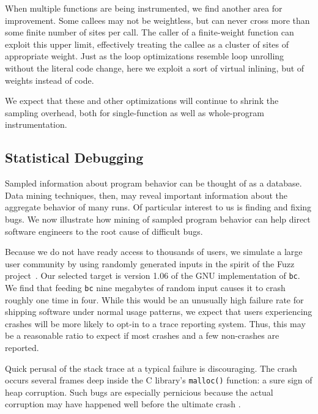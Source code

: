 When multiple functions are being instrumented, we find another area
for improvement.  Some callees may not be weightless, but can never
cross more than some finite number of sites per call.  The caller of a
finite-weight function can exploit this upper limit, effectively
treating the callee as a cluster of sites of appropriate weight.  Just
as the loop optimizations resemble loop unrolling without the literal
code change, here we exploit a sort of virtual inlining, but of
weights instead of code.

We expect that these and other optimizations will continue to shrink
the sampling overhead, both for single-function as well as
whole-program instrumentation.

\subsection{Statistical Debugging}
\label{sec:applications:mining}

Sampled information about program behavior can be thought of as a
database.  Data mining techniques, then, may reveal important
information about the aggregate behavior of many runs.  Of particular
interest to us is finding and fixing bugs.  We now illustrate how
mining of sampled program behavior can help direct software engineers
to the root cause of difficult bugs.

Because we do not have ready access to thousands of users, we simulate
a large user community by using randomly generated inputs in the
spirit of the Fuzz project~\cite{MKLMMNS95}.  Our selected target is
version 1.06 of the GNU implementation of \texttt{bc}.  We find that
feeding \texttt{bc} nine megabytes of random input causes it to crash
roughly one time in four.  While this would be an unusually high
failure rate for shipping software under normal usage patterns, we
expect that users experiencing crashes will be more likely to opt-in
to a trace reporting system.  Thus, this may be a reasonable ratio to
expect if most crashes and a few non-crashes are reported.

Quick perusal of the stack trace at a typical failure is discouraging.
The crash occurs several frames deep inside the C library's
\texttt{malloc()} function: a sure sign of heap corruption.  Such bugs
are especially pernicious because the actual corruption may have
happened well before the ultimate crash \cite{Eisenstadt1993b}.

